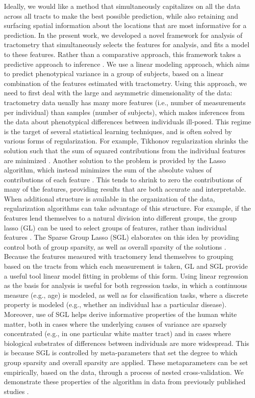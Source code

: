 Ideally, we would like a method that simultaneously capitalizes on all the data
across all tracts to make the best possible prediction, while also retaining and
surfacing spatial information about the locations that are most informative for
a prediction. In the present work, we developed a novel framework for analysis
of tractometry that simultaneously selects the features for analysis, and fits a
model to these features. Rather than a comparative approach, this framework
takes a predictive approach to inference \cite{Breiman2001-uz}. We use a linear
modeling approach, which aims to predict phenotypical variance in a group of
subjects, based on a linear combination of the features estimated with
tractometry. Using this approach, we need to first deal with the large and
asymmetric dimensionality of the data: tractometry data usually has many more
features (i.e., number of measurements per individual) than samples (number of
subjects), which makes inferences from the data about phenotypical differences
between individuals ill-posed. This regime is the target of several statistical
learning techniques, and is often solved by various forms of regularization. For
example, Tikhonov regularization shrinks the solution such that the sum of
squared contributions from the individual features are minimized
\cite{Hoerl2000-ij}. Another solution to the problem is provided by the Lasso
algorithm, which instead minimizes the sum of the absolute values of
contributions of each feature \cite{Tibshirani1996-qs}. This tends to shrink to
zero the contributions of many of the features, providing results that are both
accurate and interpretable. When additional structure is available in the
organization of the data, regularization algorithms can take advantage of this
structure. For example, if the features lend themselves to a natural division
into different groups, the group lasso (GL) can be used to select groups of
features, rather than individual features \cite{Yuan2006-ky}. The Sparse Group
Lasso (SGL) elaborates on this idea by providing control both of group sparsity,
as well as overall sparsity of the solutions \cite{simon2013sgl}. Because the
features measured with tractomery lend themselves to grouping based on the
tracts from which each measurement is taken, GL and SGL provide a useful tool
linear model fitting in problems of this form. Using linear regression as the
basis for analysis is useful for both regression tasks, in which a continuous
measure (e.g., age) is modeled, as well as for classification tasks, where a
discrete property is modeled (e.g., whether an individual has a particular
disease). Moreover, use of SGL helps derive informative properties of the human
white matter, both in cases where the underlying causes of variance are sparsely
concentrated (e.g., in one particular white matter tract) and in cases where
biological substrates of differences between individuals are more widespread.
This is because SGL is controlled by meta-parameters that set the degree to
which group sparsity and overall sparsity are applied. These metaparameters can
be set empirically, based on the data, through a process of nested
cross-validation. We demonstrate these properties of the algorithm in data from
previously published studies \cite{sarica2017corticospinal,
yeatman2014lifespan}.
